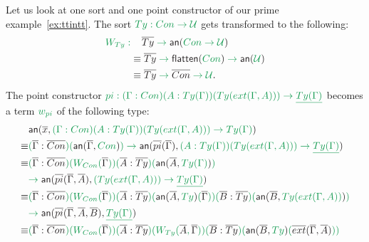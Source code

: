 \documentclass[12pt,headings=optiontohead,openany,oneside,a4paper]{book}
\theoremstyle{definition}
\newcommand{\UU}{\mathcal{U}}
\newcommand{\gr}[1]{{\color{ForestGreen}#1}}
\newcommand{\grm}[1]{\ensuremath{\gr{#1}}}
\newcommand{\blm}[1]{\ensuremath{{\color{Black}#1}}}
\newcommand{\flatten}[1]{\blm{\mathsf{flatten}(\grm{#1})}}
\newcommand{\annotate}[1]{\blm{\mathsf{an}(\grm{#1})}}
\newcommand{\anntwo}[2]{\blm{\mathsf{an}(#1, \grm{#2})}}
\begin{document}
\begin{example}
Let us look at one sort and one point constructor of our prime example~\ref{ex:ttintt}.
The sort \grm{\mathop{Ty} : \mathop{Con} \to \UU} gets transformed to the following:
\begin{align*}
\grm{W_{\mathop{Ty}} :} 
&\phantom{\equiv~} \grm{\blm{\overline{Ty}} \to \annotate{\mathop{Con} \to \UU} } \\
&\equiv \grm{\blm{\overline{Ty}} \to \flatten{\mathop{Con}} \to \annotate{\UU}} \\
&\equiv \grm{\blm{\overline{Ty}} \to \blm{\overline{Con}} \to \UU} \text{.}
\end{align*}
The point constructor
\grm{\mathop{pi} : (\Gamma : \mathop{Con})(A : \mathop{Ty}(\Gamma))(\mathop{Ty}(\mathop{ext}(\Gamma, A))) \to \underline{\mathop{Ty}(\Gamma)}}
becomes a term \grm{w_{\mathop{pi}}} of the following type:
\begin{align*}
& \grm{\anntwo{\overline{x}}{(\Gamma : \mathop{Con})(A : \mathop{Ty}(\Gamma))(\mathop{Ty}(\mathop{ext}(\Gamma, A)))
	\to \mathop{Ty}(\Gamma)}} \\
\equiv & \grm{(\blm{\overline{\Gamma} : \overline{Con}})(\anntwo{\overline{\Gamma}}{\mathop{Con}})
	\to \anntwo{\overline{pi}(\overline{\Gamma})}{(A : \mathop{Ty}(\Gamma))(\mathop{Ty}(\mathop{ext}(\Gamma, A))) \to \underline{\mathop{Ty}(\Gamma)}}} \\
\equiv & \grm{
	(\blm{\overline{\Gamma} : \overline{Con}})(W_{\mathop{Con}}(\blm{\overline{\Gamma}}))
	(\blm{\overline{A} : \overline{Ty}})(\anntwo{\overline{A}}{\mathop{Ty}(\Gamma)}) } \\
& \grm{
	\to \anntwo{\overline{pi}(\overline{\Gamma}, \overline{A})}{(\mathop{Ty}(\mathop{ext}(\Gamma, A))) \to \underline{\mathop{Ty}(\Gamma)}}
} \\
\equiv & \grm{
	(\blm{\overline{\Gamma} : \overline{Con}})(W_{\mathop{Con}}(\blm{\overline{\Gamma}}))
	(\blm{\overline{A} : \overline{Ty}})(\anntwo{\overline{A}}{\mathop{Ty}}(\blm{\overline{\Gamma}}))
	(\blm{\overline{B} : \overline{Ty}})(\anntwo{\overline{B}}{\mathop{Ty}(\mathop{ext}(\Gamma, A))}) } \\
& \grm{
	\to \anntwo{\overline{pi}(\overline{\Gamma}, \overline{A}, \overline{B})}{\underline{Ty(\Gamma)}}
} \\
\equiv & \grm{
	(\blm{\overline{\Gamma} : \overline{Con}})(W_{\mathop{Con}}(\blm{\overline{\Gamma}}))
	(\blm{\overline{A} : \overline{Ty}})(W_{\mathop{Ty}}(\blm{\overline{A}}, \blm{\overline{\Gamma}}))
	(\blm{\overline{B} : \overline{Ty}})(\anntwo{\overline{B}}{\mathop{Ty}}(\blm{\overline{ext}(\overline{\Gamma}, \overline{A})}))
}
\end{align*}
\end{example}
\end{document}
